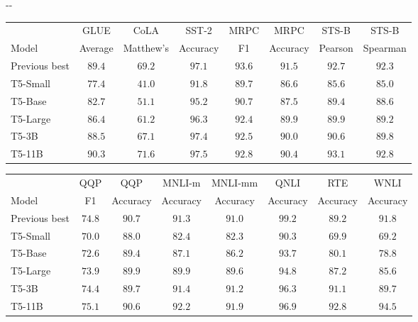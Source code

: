 \documentclass[twoside,11pt]{article}
\newlength{\offsetpage}
\newenvironment{widepage}{\begin{adjustwidth}{-\offsetpage}{-\offsetpage}
    \addtolength{\textwidth}{2\offsetpage}}
{\end{adjustwidth}}
\newcommand{\xa}{\makebox[0pt][l]{$^a$}}
\newcommand{\xb}{\makebox[0pt][l]{$^b$}}
\newcommand{\xc}{\makebox[0pt][l]{$^c$}}
\def\*#1{\mathbf{#1}}
\begin{document}
\begin{table}
\footnotesize
\begin{widepage}
\centering

\begin{tabular}{l c c c c c c c}
\toprule
                  & GLUE       & CoLA       & SST-2         & MRPC          & MRPC          & STS-B         & STS-B    \\
    Model         & Average    & Matthew's  & Accuracy      & F1            & Accuracy      & Pearson       & Spearman \\
\cmidrule(r){1-1}
\cmidrule(l){2-8}
    Previous best & $89.4$\xa  & $69.2$\xb     & $97.1$\xa    & $\*{93.6}$\xb & $\*{91.5}$\xb  & $92.7$\xb  & $92.3$\xb   \\
    T5-Small      & $77.4$     & $41.0$        & $91.8$        & $89.7$        & $86.6$        & $85.6$     & $85.0$      \\
    T5-Base       & $82.7$     & $51.1$        & $95.2$        & $90.7$        & $87.5$        & $89.4$     & $88.6$      \\
    T5-Large      & $86.4$     & $61.2$        & $96.3$        & $92.4$        & $89.9$        & $89.9$     & $89.2$      \\
    T5-3B         & $88.5$     & $67.1$        & $97.4$        & $92.5$        & $90.0$        & $90.6$     & $89.8$      \\
    T5-11B        & $\*{90.3}$ & $\*{71.6}$    & $\*{97.5}$    & $92.8$        & $90.4$        & $\*{93.1}$ & $\*{92.8}$  \\
\bottomrule
\end{tabular}

\vspace{0.2em}

\begin{tabular}{l c c c c c c c}
                  & QQP           & QQP           & MNLI-m     & MNLI-mm     & QNLI         & RTE       & WNLI     \\
    Model         & F1            & Accuracy      & Accuracy   & Accuracy    & Accuracy     & Accuracy  & Accuracy \\
\cmidrule(r){1-1}
\cmidrule(l){2-8}
    Previous best & $74.8$\xc     & $\*{90.7}$\xb & $91.3$\xa  & $91.0$\xa  & $\*{99.2}$\xa & $89.2$\xa  & $91.8$\xa \\
    T5-Small      & $70.0$        & $88.0$        & $82.4$     & $82.3$     & $90.3$       & $69.9$     & $69.2$        \\
    T5-Base       & $72.6$        & $89.4$        & $87.1$     & $86.2$     & $93.7$       & $80.1$     & $78.8$        \\
    T5-Large      & $73.9$        & $89.9$        & $89.9$     & $89.6$     & $94.8$       & $87.2$     & $85.6$        \\
    T5-3B         & $74.4$        & $89.7$        & $91.4$     & $91.2$     & $96.3$       & $91.1$     & $89.7$        \\
    T5-11B        & $\*{75.1}$    & $90.6$        & $\*{92.2}$ & $\*{91.9}$ & $96.9$       & $\*{92.8}$ & $\*{94.5}$    \\
\bottomrule
\end{tabular}


\end{widepage}
\end{table}
\end{document}
